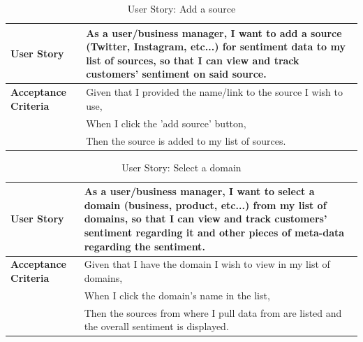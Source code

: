 \documentclass[12pt]{article}
\begin{document}
\begin{table}[htbp]
  \caption{User Story: Add a source}
  \begin{tabular}{|p{}|p{}|}
    \hline
    \textbf{User Story}          & As a user/business manager, I want to add a source (Twitter, Instagram, etc...) for sentiment data to my list of sources, so that I can view and track customers' sentiment on said source. \\
    \hline
    \textbf{Acceptance Criteria} &
    Given that I provided the name/link to the source I wish to use,                                                                                                                                                           \\
                                 & When I click the 'add source' button,                                                                                                                                                       \\
                                 & Then the source is added to my list of sources.                                                                                                                                             \\
    \hline
  \end{tabular}
\end{table}

\begin{table}[htbp]
  \caption{User Story: Select a domain}
  \begin{tabular}{|p{}|p{}|}
    \hline
    \textbf{User Story}          & As a user/business manager, I want to select a domain (business, product, etc...) from my list of domains, so that I can view and track customers' sentiment regarding it and other pieces of meta-data regarding the sentiment. \\
    \hline
    \textbf{Acceptance Criteria} &
    Given that I have the domain I wish to view in my list of domains,                                                                                                                                                                                              \\
                                 & When I click the domain's name in the list,                                                                                                                                                                                      \\
                                 & Then the sources from where I pull data from are listed and the overall sentiment is displayed.                                                                                                                                  \\
    \hline
  \end{tabular}
\end{table}
\end{document}
